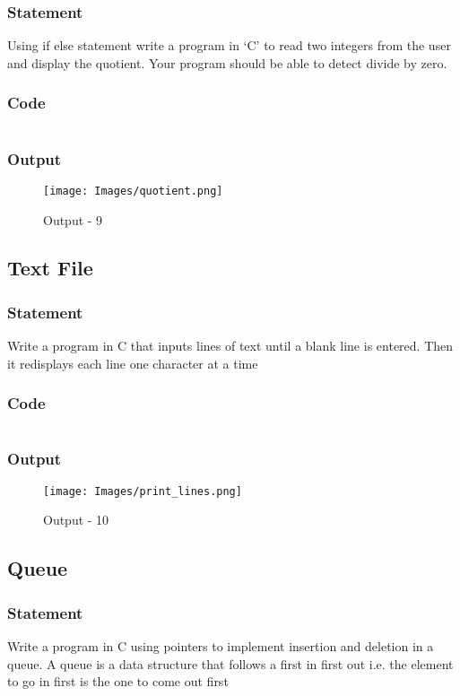 \subsubsection{Statement}
Using if else statement write a program in ‘C’ to read two integers from the user and display
the quotient. Your program should be able to detect divide by zero.
\subsubsection{Code}
\inputminted[]{c}{./code/quotient.cpp}
\subsubsection{Output}
\begin{figure}[!htb]
  \centering
  \texttt{[image: Images/quotient.png]}
  \label{Output-9}
  \caption{Output - 9}
\end{figure}


\pagebreak
\subsection{Text File}
\subsubsection{Statement}
Write a program in C that inputs lines of text until a blank line is entered. Then it redisplays
each line one character at a time
\subsubsection{Code}
\inputminted[]{c}{./code/print_lines.cpp}
\subsubsection{Output}
\begin{figure}[!htb]
  \centering
  \texttt{[image: Images/print\_lines.png]}
  \label{Output-10}
  \caption{Output - 10}
\end{figure}

\pagebreak
\subsection{Queue}
\subsubsection{Statement}
Write a program in C using pointers to implement insertion and deletion in a queue. A queue
is a data structure that follows a first in first out i.e. the element to go in first is the one to come
out first
